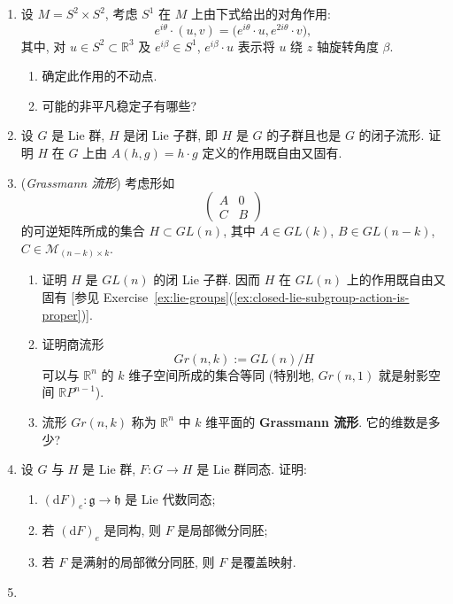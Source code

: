 \begin{RiemannExercise}
\begin{enumerate}[label=(\arabic*),ref=\arabic*,leftmargin=*]
\begin{enumerate}[label=(\alph*),leftmargin=*]
\end{enumerate}
\item\label{ex:diagonal-circle-action-on-product-of-spheres} 设 $M=S^2\times S^2$, 考虑 $S^1$ 在 $M$ 上由下式给出的对角作用:
\[
  e^{i\theta}\cdot(u,v)=\bigl(e^{i\theta}\cdot u,e^{2i\theta}\cdot v\bigr),
\]
其中, 对 $u\in S^2\subset\mathbb{R}^3$ 及 $e^{i\beta}\in S^1$, $e^{i\beta}\cdot u$ 表示将 $u$ 绕 $z$ 轴旋转角度 $\beta$.
\begin{enumerate}[label=(\alph*),leftmargin=*]
\item 确定此作用的不动点.
\item 可能的非平凡稳定子有哪些?
\end{enumerate}
\item\label{ex:closed-lie-subgroup-action-is-proper} 设 $G$ 是 Lie 群, $H$ 是闭 Lie 子群, 即 $H$ 是 $G$ 的子群且也是 $G$ 的闭子流形. 证明 $H$ 在 $G$ 上由 $A(h,g)=h\cdot g$ 定义的作用既自由又固有.
\item\label{ex:grassmannian-as-a-quotient} (\emph{Grassmann 流形}) 考虑形如
\[
  \begin{pmatrix}A&0\\C&B\end{pmatrix}
\]
的可逆矩阵所成的集合 $H\subset GL(n)$, 其中 $A\in GL(k)$, $B\in GL(n-k)$, $C\in\mathcal M_{(n-k)\times k}$.
\begin{enumerate}[label=(\alph*),leftmargin=*]
\item 证明 $H$ 是 $GL(n)$ 的闭 Lie 子群. 因而 $H$ 在 $GL(n)$ 上的作用既自由又固有 [参见 Exercise~\ref{ex:lie-groups}(\ref{ex:closed-lie-subgroup-action-is-proper})].
\item 证明商流形
\[
  Gr(n,k):=GL(n)/H
\]
可以与 $\mathbb{R}^n$ 的 $k$ 维子空间所成的集合等同 (特别地, $Gr(n,1)$ 就是射影空间 $\mathbb{R}P^{n-1}$).
\item 流形 $Gr(n,k)$ 称为 $\mathbb{R}^n$ 中 $k$ 维平面的 \textbf{Grassmann 流形}. 它的维数是多少?
\end{enumerate}
\item\label{ex:differential-of-lie-group-homomorphism} 设 $G$ 与 $H$ 是 Lie 群, $F:G\to H$ 是 Lie 群同态. 证明:
\begin{enumerate}[label=(\alph*),leftmargin=*]
\item $(\mathrm{d}F)_e:\mathfrak g\to\mathfrak h$ 是 Lie 代数同态;
\item 若 $(\mathrm{d}F)_e$ 是同构, 则 $F$ 是局部微分同胚;
\item 若 $F$ 是满射的局部微分同胚, 则 $F$ 是覆盖映射.
\end{enumerate}
\item\label{ex:quaternions-and-covering-of-rotation-group}

\end{enumerate}
\end{RiemannExercise}
